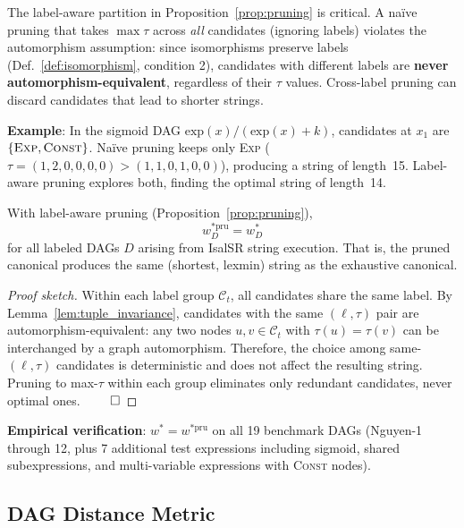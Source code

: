 \begin{remark}
\label{rem:label_grouping}
The label-aware partition in Proposition~\ref{prop:pruning} is critical.
A na\"ive pruning that takes $\max \tau$ across \emph{all} candidates (ignoring labels)
violates the automorphism assumption: since isomorphisms preserve labels
(Def.~\ref{def:isomorphism}, condition 2), candidates with different labels
are \textbf{never automorphism-equivalent}, regardless of their $\tau$ values.
Cross-label pruning can discard candidates that lead to shorter strings.

\textbf{Example}: In the sigmoid DAG $\text{exp}(x) / (\text{exp}(x) + k)$, candidates
at $x_1$ are $\{\textsc{Exp}, \textsc{Const}\}$. Na\"ive pruning keeps only
\textsc{Exp} ($\tau = (1,2,0,0,0,0) > (1,1,0,1,0,0)$), producing a string of
length~15. Label-aware pruning explores both, finding the optimal string of length~14.
\end{remark}

\begin{theorem}
\label{thm:pruned_optimality}
With label-aware pruning (Proposition~\ref{prop:pruning}),
\[
  w^{*\text{pru}}_D = w^*_D
\]
for all labeled DAGs $D$ arising from IsalSR string execution. That is, the
pruned canonical produces the same (shortest, lexmin) string as the exhaustive
canonical.
\end{theorem}

\begin{proof}[Proof sketch]
Within each label group $\mathcal{C}_t$, all candidates share the same label.
By Lemma~\ref{lem:tuple_invariance}, candidates with the same $(\ell, \tau)$ pair
are automorphism-equivalent: any two nodes $u, v \in \mathcal{C}_t$ with
$\tau(u) = \tau(v)$ can be interchanged by a graph automorphism. Therefore,
the choice among same-$(\ell, \tau)$ candidates is deterministic and does not
affect the resulting string. Pruning to max-$\tau$ within each group eliminates
only redundant candidates, never optimal ones. $\qed$
\end{proof}

\textbf{Empirical verification}: $w^* = w^{*\text{pru}}$ on all 19 benchmark DAGs
(Nguyen-1 through 12, plus 7 additional test expressions including sigmoid,
shared subexpressions, and multi-variable expressions with \textsc{Const} nodes).

\subsection{DAG Distance Metric}

